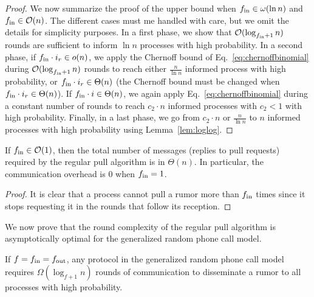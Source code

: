 \begin{proof}
We now summarize the proof of the upper bound when $f_\text{in}\in \omega(\ln n)$ and $f_\text{in}\in\mathcal{O}(n)$. The different cases must me handled with care, but we omit the details for simplicity purposes. In a first phase, we show that  $\mathcal{O}(\log_{f_\text{in} + 1} n)$  rounds are sufficient to inform $\ln n$ processes with high probability. In a second phase, if $f_\text{in} \cdot i_{r} \in o(n)$, we apply the Chernoff bound of Eq.~\eqref{eq:chernoffbinomial} during $\mathcal{O}(\log_{f_\text{in} + 1} n)$  rounds to reach either $\frac{n}{\ln n}$ informed process with high probability, or $f_\text{in} \cdot i_{r} \in \Theta(n)$ (the Chernoff bound must be changed when $f_\text{in} \cdot i_{r} \in \Theta(n)$). If $f_\text{in} \cdot i \in \Theta(n)$, we again apply Eq.~\eqref{eq:chernoffbinomial} during a constant number of rounds to reach $c_2 \cdot n$ informed processes with $c_2<1$ with high probability. Finally, in a last phase, we go from $c_2 \cdot  n$ or $\frac{n}{\ln n}$ to $n$ informed processes with high probability using Lemma~\ref{lem:loglog}.

\end{proof}


\begin{corollary}
  If $f_\text{in} \in \mathcal{O}(1)$, then the total number of messages (replies to pull requests) required by the regular pull algorithm is in $\Theta(n)$. In particular, the communication overhead is 0 when $f_\text{in}=1$.
\end{corollary}

\begin{proof}
  It is clear that a process cannot pull a rumor more than $f_\text{in}$ times since it stops requesting it in the rounds that follow its reception.
\end{proof}


We now prove that the round complexity of the regular pull algorithm is asymptotically optimal for the generalized random phone call model.

\begin{theorem}
  \label{thm:pushpullround}
If $f=f_\text{in}=f_\text{out}$, any protocol in the generalized random phone call model requires $\Omega(\log_{f+1} n)$ rounds of communication to disseminate a rumor to all processes with high probability.
\end{theorem}

